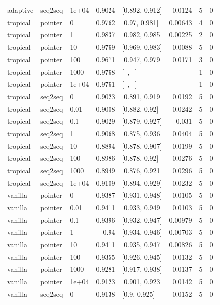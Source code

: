 \documentclass[10pt]{article}
\begin{document}
{\begin{longtable}{lllrlrrr}
adaptive & seq2seq & 1e+04 & 0.9024 & [0.892, 0.912] & 0.0124 & 5 & 0\\
tropical & pointer & 0 & 0.9762 & [0.97, 0.981] & 0.00643 & 4 & 0\\
tropical & pointer & 1 & 0.9837 & [0.982, 0.985] & 0.00225 & 2 & 0\\
tropical & pointer & 10 & 0.9769 & [0.969, 0.983] & 0.0088 & 5 & 0\\
tropical & pointer & 100 & 0.9671 & [0.947, 0.979] & 0.0171 & 3 & 0\\
tropical & pointer & 1000 & 0.9768 & [--, --] & -- & 1 & 0\\
tropical & pointer & 1e+04 & 0.9761 & [--, --] & -- & 1 & 0\\
tropical & seq2seq & 0 & 0.9023 & [0.891, 0.919] & 0.0192 & 5 & 0\\
tropical & seq2seq & 0.01 & 0.9008 & [0.882, 0.92] & 0.0242 & 5 & 0\\
tropical & seq2seq & 0.1 & 0.9029 & [0.879, 0.927] & 0.031 & 5 & 0\\
tropical & seq2seq & 1 & 0.9068 & [0.875, 0.936] & 0.0404 & 5 & 0\\
tropical & seq2seq & 10 & 0.8894 & [0.878, 0.907] & 0.0199 & 5 & 0\\
tropical & seq2seq & 100 & 0.8986 & [0.878, 0.92] & 0.0276 & 5 & 0\\
tropical & seq2seq & 1000 & 0.8949 & [0.876, 0.921] & 0.0296 & 5 & 0\\
tropical & seq2seq & 1e+04 & 0.9109 & [0.894, 0.929] & 0.0232 & 5 & 0\\
vanilla & pointer & 0 & 0.9387 & [0.931, 0.948] & 0.0105 & 5 & 0\\
vanilla & pointer & 0.01 & 0.9411 & [0.933, 0.949] & 0.0103 & 5 & 0\\
vanilla & pointer & 0.1 & 0.9396 & [0.932, 0.947] & 0.00979 & 5 & 0\\
vanilla & pointer & 1 & 0.94 & [0.934, 0.946] & 0.00703 & 5 & 0\\
vanilla & pointer & 10 & 0.9411 & [0.935, 0.947] & 0.00826 & 5 & 0\\
vanilla & pointer & 100 & 0.9355 & [0.926, 0.945] & 0.0132 & 5 & 0\\
vanilla & pointer & 1000 & 0.9281 & [0.917, 0.938] & 0.0137 & 5 & 0\\
vanilla & pointer & 1e+04 & 0.9123 & [0.901, 0.923] & 0.0142 & 5 & 0\\
vanilla & seq2seq & 0 & 0.9138 & [0.9, 0.925] & 0.0152 & 5 & 0\\

\end{longtable}}
\end{document}
